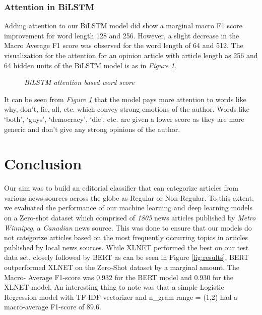 \documentclass[11pt]{article}
\begin{document}
\subsubsection{Attention in BiLSTM}
Adding attention to our BiLSTM model did show a marginal macro F1 score improvement for word length 128 and 256. However, a slight decrease in the Macro Average F1 score was observed for the word length of 64 and 512. The visualization for the attention for an opinion article with article length as 256 and 64 hidden units of the BiLSTM model is as in \textit{Figure \ref{fig:attention}}.

\begin{figure}[!htb]
\caption{\label{fig:attention}  \textit{BiLSTM attention based word score}}
\end{figure}


It can be seen from \textit{Figure \ref{fig:attention}} that the model pays more attention to words like why, don't, lie, all, etc. which convey strong emotions of the author. Words like `both', `guys', `democracy', `die', etc. are given a lower score as they are more generic and don't give any strong opinions of the author. 




\section{Conclusion}
\label{sec:con}
Our aim was to build an editorial classifier that can categorize articles from various news sources across the globe as Regular or Non-Regular. To this extent, we evaluated the performance of our machine learning and deep learning models on a Zero-shot dataset which comprised of \textit{1805} news articles published by \textit{Metro Winnipeg}, a \textit{Canadian} news source. This was done to ensure that our models do not categorize articles based on the most frequently occurring topics in articles published by local news sources. While XLNET performed the best on our test data set, closely followed by BERT as can be seen in Figure \ref{fig:results}, BERT outperformed XLNET on the Zero-Shot dataset by a marginal amount. The Macro- Average F1-score was 0.932 for the BERT model and 0.930 for the XLNET model.
An interesting thing to note was that a simple Logistic Regression model with TF-IDF vectorizer and n\_gram range = (1,2) had a macro-average F1-score of 89.6.
\end{document}

